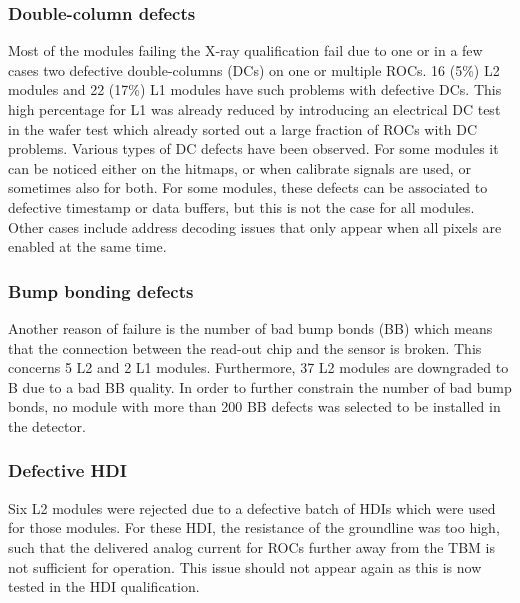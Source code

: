 \documentclass[a4paper,12pt,twoside]{article}
\begin{document}
\subsubsection{Double-column defects}
Most of the modules failing the X-ray qualification fail due to one or in a few cases two defective double-columns (DCs) on one or multiple ROCs. 16 (5\%) L2 modules and 22 (17\%) L1 modules have such problems with defective DCs. This high percentage for L1 was already reduced by introducing an electrical DC test in the wafer test which already sorted out a large fraction of ROCs with DC problems. Various types of DC defects have been observed. For some modules it can be noticed either on the hitmaps, or when calibrate signals are used, or sometimes also for both. For some modules, these defects can be associated to defective timestamp or data buffers, but this is not the case for all modules. Other cases include address decoding issues that only appear when all pixels are enabled at the same time.
\subsubsection{Bump bonding defects}
Another reason of failure is the number of bad bump bonds (BB) which means that the connection between the read-out chip and the sensor is broken. This concerns 5 L2 and 2 L1 modules. Furthermore, 37 L2 modules are downgraded to B due to a bad BB quality. In order to further constrain the number of bad bump bonds, no module with more than 200 BB defects was selected to be installed in the detector.
\subsubsection{Defective HDI}
Six L2 modules were rejected due to a defective batch of HDIs which were used for those modules. For these HDI, the resistance of the groundline was too high, such that the delivered analog current for ROCs further away from the TBM is not sufficient for operation. This issue should not appear again as this is now tested in the HDI qualification.
\end{document}
